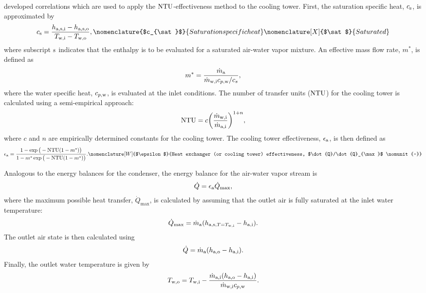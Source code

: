 \textcite{braun1989} developed correlations which are used to apply
the $\mathrm{NTU}$-effectiveness method to the cooling tower. First, the
saturation specific heat, $c_{\text{s}}$, is approximated by
\begin{equation}
  c_{\sat} = \frac{h_{\air,\sat,\inl}-h_{\air,\sat,\out}}{T_{\wat,\inl} - T_{\wat,\out}},
  \nomenclature{$c_{\sat}$}{Saturation specific heat \nomunit{\btu\per\poundmass\rankine}}
  \nomenclature[X]{$\sat$}{Saturated}
\end{equation}
where subscript $\text{s}$ indicates that the enthalpy is to be evaluated 
for a saturated air-water vapor mixture.
An effective mass flow rate, $m^*$, is defined as
\begin{equation}
  m^* = \frac{\dot{m}_{\text{a}}}{\dot{m}_{\text{w},\text{i}} c_{p,\text{w}}/c_s},
\end{equation}
where the water specific heat, $c_{p,\text{w}}$, is evaluated at the inlet conditions.
The number of transfer units ($\mathrm{NTU}$) for the cooling tower is calculated using
a semi-empirical approach:
\begin{equation}
  \mathrm{NTU} = c \bigg( \frac{\dot{m}_{\text{w},\text{i}}}{\dot{m}_{\text{a},\text{i}}} \bigg)^{1+n},
\end{equation}
where $c$ and $n$ are empirically determined constants for the cooling tower.
The cooling tower effectiveness, $\epsilon_{\text{a}}$, is then defined as
\begin{equation}
  \epsilon_{\air} = \frac{1-\exp{\big(-\NTU(1-m^*)\big)}}{1-m^*\exp{\big(-\NTU(1-m^*)\big)}}.
  \nomenclature[W]{$\epsilon$}{Heat exchanger (or cooling tower) effectiveness, $\dot{Q}/\dot{Q}_{\max}$ \nomunit{-}}
\end{equation}

Analogous to the energy balances for the condenser, the energy balance for the
air-water vapor stream is
\begin{equation}
  \dot{Q} = \epsilon_{\text{a}} \dot{Q}_{\max},
\end{equation}
where the maximum possible heat transfer, $\dot{Q}_{\max}$, is calculated 
by assuming that the outlet air is fully saturated at the inlet water temperature:
\begin{equation}
  \dot{Q}_{\max} = \dot{m}_{\text{a}} (h_{\text{a},\text{s},T=T_{\text{w},\text{i}}} - h_{\text{a},\text{i}}).
\end{equation}
The outlet air state is then calculated using
\begin{equation}
  \dot{Q} = \dot{m}_{\text{a}} (h_{\text{a},\text{o}} - h_{\text{a},\text{i}}).
\end{equation}
Finally, the outlet water temperature is given by
\begin{equation}
  T_{\text{w},\text{o}} = T_{\text{w},\text{i}} - \frac{\dot{m}_{\text{a},\text{i}}(h_{\text{a},\text{o}} - h_{\text{a},\text{i}})}{\dot{m}_{\text{w},\text{i}} c_{p,\text{w}}}.
\end{equation}

